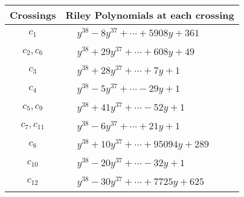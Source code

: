 \documentclass[1p]{elsarticle_modified}
\theoremstyle{definition}
\begin{document}
\begin{tabular}{m{50pt}|m{274pt}}
Crossings & \hspace{64pt}Riley Polynomials at each crossing \\
\hline $$\begin{aligned}c_{1}\end{aligned}$$&$\begin{aligned}
&y^{38}-8 y^{37}+\cdots+5908 y+361
\end{aligned}$\\
\hline $$\begin{aligned}c_{2},c_{6}\end{aligned}$$&$\begin{aligned}
&y^{38}+29 y^{37}+\cdots+608 y+49
\end{aligned}$\\
\hline $$\begin{aligned}c_{3}\end{aligned}$$&$\begin{aligned}
&y^{38}+28 y^{37}+\cdots+7 y+1
\end{aligned}$\\
\hline $$\begin{aligned}c_{4}\end{aligned}$$&$\begin{aligned}
&y^{38}-5 y^{37}+\cdots-29 y+1
\end{aligned}$\\
\hline $$\begin{aligned}c_{5},c_{9}\end{aligned}$$&$\begin{aligned}
&y^{38}+41 y^{37}+\cdots-52 y+1
\end{aligned}$\\
\hline $$\begin{aligned}c_{7},c_{11}\end{aligned}$$&$\begin{aligned}
&y^{38}-6 y^{37}+\cdots+21 y+1
\end{aligned}$\\
\hline $$\begin{aligned}c_{8}\end{aligned}$$&$\begin{aligned}
&y^{38}+10 y^{37}+\cdots+95094 y+289
\end{aligned}$\\
\hline $$\begin{aligned}c_{10}\end{aligned}$$&$\begin{aligned}
&y^{38}-20 y^{37}+\cdots-32 y+1
\end{aligned}$\\
\hline $$\begin{aligned}c_{12}\end{aligned}$$&$\begin{aligned}
&y^{38}-30 y^{37}+\cdots+7725 y+625
\end{aligned}$\\
\hline
\end{tabular}\\~\\
\end{document}
